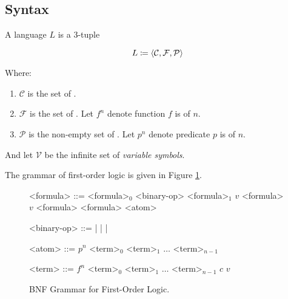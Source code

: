 \subsection{Syntax}

\begin{definition}
    A  language $L$ is a 3-tuple

    \begin{equation}
        L \coloneqq \langle {\mathcal{C}, \mathcal{F}, \mathcal{P}} \rangle
    \end{equation}

    Where:

    \begin{enumerate}
        \item $\mathcal{C}$ is the set of .
        \item $\mathcal{F}$ is the set of .
            Let $f^n$ denote function $f$ is of  $n$.
        \item $\mathcal{P}$ is the non-empty set of .
            Let $p^n$ denote predicate $p$ is of  $n$.
    \end{enumerate}
    
    And let $\mathcal{V}$ be the infinite set of \textit{variable symbols}.
\end{definition}

The grammar of first-order logic is given in Figure \ref{fig:first_order_logic_bnf}.

\begin{figure}[H]
    \centering
    \begin{grammar}
    <formula> ::= \lit{$($} <formula>$_0$ <binary-op> <formula>$_1$ \lit{$)$}
        \alt \lit{$\Forall$} $v$ \lit{$\colon$} <formula>
            \quad{}
        \alt \lit{$\Exists$} $v$ \lit{$\colon$} <formula>
            \quad{}
        \alt \lit{$\neg$} <formula>
        \alt <atom>
    
    <binary-op> ::= \lit{$\land$} | \lit{$\lor$} | \lit{$\to$} | \lit{$\Iff$}
    
    <atom> ::= $p^n$ \lit{$($} <term>$_0$ \lit{,} <term>$_1$ \lit{,} 
        $\ldots$ \lit{,} <term>$_{n-1}$ \lit{$)$} \quad{}
    
    <term> ::= $f^n$ \lit{$($} <term>$_0$ \lit{,} <term>$_1$ \lit{,} 
            $\ldots$ \lit{,} <term>$_{n-1}$ \lit{$)$} \quad{}
        \alt $c$ \quad{}
        \alt $v$ \quad{}
    \end{grammar}
    \caption{BNF Grammar for First-Order Logic.}
    \label{fig:first_order_logic_bnf}
\end{figure}


